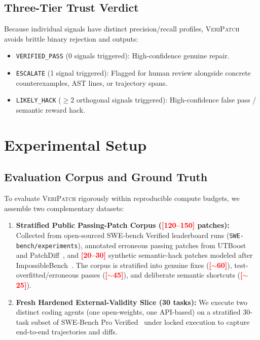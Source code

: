\documentclass[conference]{IEEEtran}
\newcommand{\tool}{\textsc{VeriPatch}}
\newcommand{\tbd}[1]{\textcolor{red}{\textbf{[#1]}}}
\begin{document}
\subsection{Three-Tier Trust Verdict}
Because individual signals have distinct precision/recall profiles, \tool{} avoids brittle binary rejection and outputs:
\begin{itemize}
    \item \texttt{VERIFIED\_PASS} (0 signals triggered): High-confidence genuine repair.
    \item \texttt{ESCALATE} (1 signal triggered): Flagged for human review alongside concrete counterexamples, AST lines, or trajectory spans.
    \item \texttt{LIKELY\_HACK} ($\ge 2$ orthogonal signals triggered): High-confidence false pass / semantic reward hack.
\end{itemize}

\section{Experimental Setup}
\label{sec:setup}

\subsection{Evaluation Corpus and Ground Truth}
To evaluate \tool{} rigorously within reproducible compute budgets, we assemble two complementary datasets:
\begin{enumerate}
    \item \textbf{Stratified Public Passing-Patch Corpus (\tbd{120--150} patches):} Collected from open-sourced SWE-bench Verified leaderboard runs (\texttt{SWE-bench/experiments}), annotated erroneous passing patches from UTBoost~\cite{yu2025utboost} and PatchDiff~\cite{wang2026patchdiff}, and \tbd{20--30} synthetic semantic-hack patches modeled after ImpossibleBench~\cite{zhong2026impossiblebench}. The corpus is stratified into genuine fixes (\tbd{$\sim$60}), test-overfitted/erroneous passes (\tbd{$\sim$45}), and deliberate semantic shortcuts (\tbd{$\sim$25}).
    \item \textbf{Fresh Hardened External-Validity Slice (30 tasks):} We execute two distinct coding agents (one open-weights, one API-based) on a stratified 30-task subset of SWE-Bench Pro Verified~\cite{zheng2026swebenchpro} under locked execution to capture end-to-end trajectories and diffs.
\end{enumerate}
\end{document}
